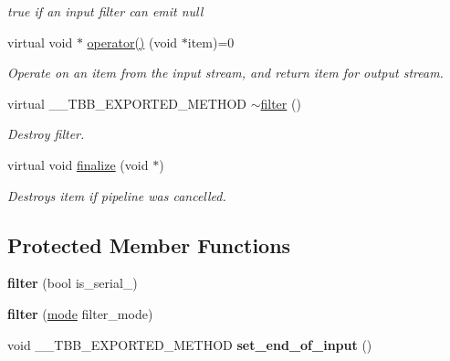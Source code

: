 \begin{DoxyCompactItemize}
\begin{DoxyCompactList}\small\item\em true if an input filter can emit null \end{DoxyCompactList}\item 
virtual void $\ast$ \hyperlink{classtbb_1_1filter_a04b442ece10fd08f98d098ed5d0cbe35}{operator()} (void $\ast$item)=0
\begin{DoxyCompactList}\small\item\em Operate on an item from the input stream, and return item for output stream. \end{DoxyCompactList}\item 
virtual \+\_\+\+\_\+\+T\+B\+B\+\_\+\+E\+X\+P\+O\+R\+T\+E\+D\+\_\+\+M\+E\+T\+H\+O\+D \hyperlink{classtbb_1_1filter_a73337fb0e69db82e7c5025e0297ebac5}{$\sim$filter} ()
\begin{DoxyCompactList}\small\item\em Destroy filter. \end{DoxyCompactList}\item 
virtual void \hyperlink{classtbb_1_1filter_a7f48cc9951e3cf7389e4c39d8b76e8ac}{finalize} (void $\ast$)
\begin{DoxyCompactList}\small\item\em Destroys item if pipeline was cancelled. \end{DoxyCompactList}\end{DoxyCompactItemize}
\subsection*{Protected Member Functions}
\begin{DoxyCompactItemize}
\item 
\hypertarget{classtbb_1_1filter_ae651887a41bbff4e0f5c7108f6c01d48}{}{\bfseries filter} (bool is\+\_\+serial\+\_\+)\label{classtbb_1_1filter_ae651887a41bbff4e0f5c7108f6c01d48}

\item 
\hypertarget{classtbb_1_1filter_a1cf46b6eb3b93fa0dc9864dc72ae4c1d}{}{\bfseries filter} (\hyperlink{classtbb_1_1filter_a8145c736bafcf0b401d50bf1a1df9125}{mode} filter\+\_\+mode)\label{classtbb_1_1filter_a1cf46b6eb3b93fa0dc9864dc72ae4c1d}

\item 
\hypertarget{classtbb_1_1filter_abf8ab6ab2e341422a0372e9fa03073db}{}void \+\_\+\+\_\+\+T\+B\+B\+\_\+\+E\+X\+P\+O\+R\+T\+E\+D\+\_\+\+M\+E\+T\+H\+O\+D {\bfseries set\+\_\+end\+\_\+of\+\_\+input} ()\label{classtbb_1_1filter_abf8ab6ab2e341422a0372e9fa03073db}

\end{DoxyCompactItemize}
